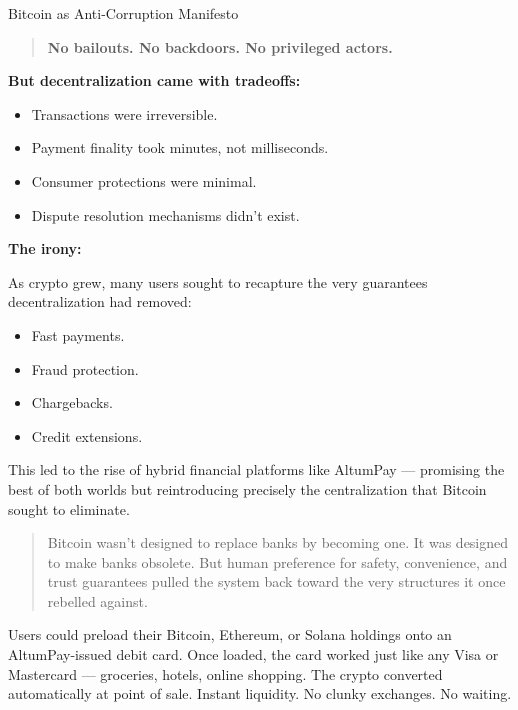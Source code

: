 \begin{HistoricalSidebar}{Bitcoin as Anti-Corruption Manifesto}
    \begin{quote}
    \textbf{No bailouts. No backdoors. No privileged actors.}
    \end{quote}
    
    \medskip
    
    \textbf{But decentralization came with tradeoffs:}
    
    \begin{itemize}
    \item Transactions were irreversible.
    \item Payment finality took minutes, not milliseconds.
    \item Consumer protections were minimal.
    \item Dispute resolution mechanisms didn't exist.
    \end{itemize}
    
    \medskip
    
    \textbf{The irony:}
    
    As crypto grew, many users sought to recapture the very guarantees decentralization had removed:
    
    \begin{itemize}
    \item Fast payments.
    \item Fraud protection.
    \item Chargebacks.
    \item Credit extensions.
    \end{itemize}
    
    This led to the rise of hybrid financial platforms like AltumPay — promising the best of both worlds but reintroducing precisely the centralization that Bitcoin sought to eliminate.
    
    \medskip
    
    \begin{quote}
    Bitcoin wasn’t designed to replace banks by becoming one.  
    It was designed to make banks obsolete.  
    But human preference for safety, convenience, and trust guarantees  
    pulled the system back toward the very structures it once rebelled against.
    \end{quote}
    
\end{HistoricalSidebar}
    

Users could preload their Bitcoin, Ethereum, or Solana holdings onto an AltumPay-issued debit card. Once loaded, the card worked just like any Visa or Mastercard --- groceries, hotels, online shopping. The crypto converted automatically at point of sale. Instant liquidity. No clunky exchanges. No waiting.

